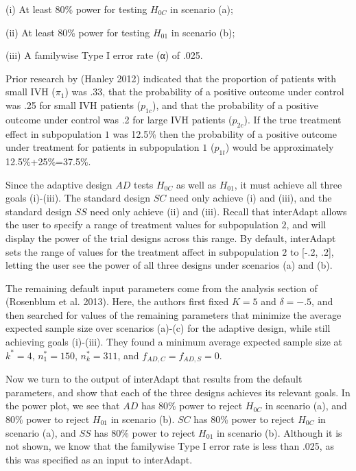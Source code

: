 \documentclass{article}
\newcommand{\interAdapt}{\textsf{interAdapt }}
\begin{document}
\begin{description}
\item  (i) At least 80\% power for testing $H_{0C}$ in scenario (a);
\item  (ii) At least 80\% power for testing $H_{01}$ in scenario (b);
\item  (iii) A familywise Type I error rate (α) of .025.
\end{description}

Prior research by (Hanley 2012)\cite{Hanley2012} indicated that the proportion of patients with small IVH ($π_1$) was .33, that the probability of a positive outcome under control was .25 for small IVH patients ($p_{1c}$), and that the probability of a positive outcome under control was .2 for large IVH patients ($p_{2c}$).  If the true treatment effect in subpopulation $1$ was 12.5\% then the probability of a positive outcome under treatment for patients in subpopulation $1$ ($p_{1t}$) would be approximately 12.5\%+25\%=37.5\%.

Since the adaptive design $AD$ tests $H_{0C}$ as well as $H_{01}$, it must achieve all three goals (i)-(iii). The standard design $SC$ need only achieve (i) and (iii), and the standard design $SS$ need only achieve (ii) and (iii). Recall that \interAdapt allows the user to specify a range of treatment values for subpopulation $2$, and will display the power of the trial designs across this range. By default, \interAdapt sets the range of values for the treatment affect in subpopulation $2$ to [-.2, .2], letting the user see the power of all three designs under scenarios (a) and (b). %
 
The remaining default input parameters come from the analysis section of (Rosenblum et al. 2013)\cite{Rosenblum2013AdaptMISTIE}. Here, the authors first fixed $K=5$ and $δ=-.5$, and then searched for values of the remaining parameters that minimize the average expected sample size over scenarios (a)-(c) for the adaptive design, while still achieving goals (i)-(iii). They found a minimum average expected sample size at $k^*=4$, $n_1^*=150$, $n_k^*=311$, and $f_{AD,C}=f_{AD,S}=0$. %

Now we turn to the output of \interAdapt that results from the default parameters, and show that each of the three designs achieves its relevant goals. In the power plot, we see that $AD$ has 80\% power to reject $H_{0C}$ in scenario (a), and 80\% power to reject $H_{01}$ in scenario (b). $SC$ has 80\% power to reject $H_{0C}$ in scenario (a), and $SS$ has 80\% power to reject $H_{01}$ in scenario (b). Although it is not shown, we know that the familywise Type I error rate is less than .025, as this was specified as an input to \textsf{interAdapt}. %
\end{document}
